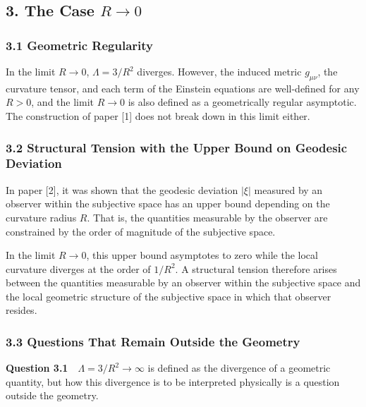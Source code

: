 \documentclass[a4paper,11pt]{article}
\theoremstyle{definition}
\begin{document}
\subsection{\texorpdfstring{3. The Case \(R \to 0\)}{3. The Case R \textbackslash to 0}}\label{the-case-r-to-0}

\subsubsection{3.1 Geometric Regularity}\label{geometric-regularity-1}

In the limit \(R \to 0\), \(\Lambda = 3/R^2\) diverges. However, the induced metric \(g_{\mu\nu}\), the curvature tensor, and each term of the Einstein equations are well-defined for any \(R > 0\), and the limit \(R \to 0\) is also defined as a geometrically regular asymptotic. The construction of paper {[}1{]} does not break down in this limit either.

\subsubsection{3.2 Structural Tension with the Upper Bound on Geodesic Deviation}\label{structural-tension-with-the-upper-bound-on-geodesic-deviation}

In paper {[}2{]}, it was shown that the geodesic deviation \(|\xi|\) measured by an observer within the subjective space has an upper bound depending on the curvature radius \(R\). That is, the quantities measurable by the observer are constrained by the order of magnitude of the subjective space.

In the limit \(R \to 0\), this upper bound asymptotes to zero while the local curvature diverges at the order of \(1/R^2\). A structural tension therefore arises between the quantities measurable by an observer within the subjective space and the local geometric structure of the subjective space in which that observer resides.

\subsubsection{3.3 Questions That Remain Outside the Geometry}\label{questions-that-remain-outside-the-geometry-1}

\textbf{Question 3.1}　\(\Lambda = 3/R^2 \to \infty\) is defined as the divergence of a geometric quantity, but how this divergence is to be interpreted physically is a question outside the geometry.
\end{document}
